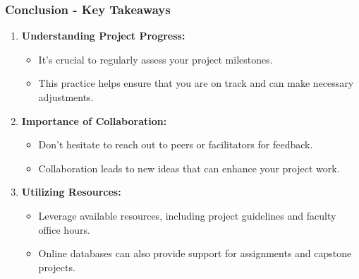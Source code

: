 \documentclass[aspectratio=169]{beamer}
\begin{document}
\begin{frame}[fragile]
    \frametitle{Conclusion - Key Takeaways}
    \begin{enumerate}
        \item \textbf{Understanding Project Progress:}
            \begin{itemize}
                \item It's crucial to regularly assess your project milestones.
                \item This practice helps ensure that you are on track and can make necessary adjustments.
            \end{itemize}
            
        \item \textbf{Importance of Collaboration:}
            \begin{itemize}
                \item Don't hesitate to reach out to peers or facilitators for feedback.
                \item Collaboration leads to new ideas that can enhance your project work.
            \end{itemize}
            
        \item \textbf{Utilizing Resources:}
            \begin{itemize}
                \item Leverage available resources, including project guidelines and faculty office hours.
                \item Online databases can also provide support for assignments and capstone projects.
            \end{itemize}
    \end{enumerate}
\end{frame}
\end{document}
